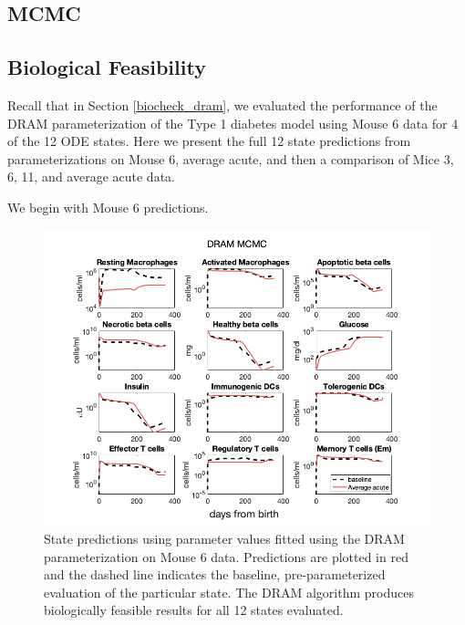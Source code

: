 \begin{appendices}
\section{MCMC} \label{MCMC_appendix}
\subsection{Biological Feasibility} \label{appendix:mcmcBioCheck}
Recall that in Section \ref{biocheck_dram}, we evaluated the performance of the DRAM parameterization of the Type 1 diabetes model using Mouse 6 data for 4 of the 12 ODE states. Here we present the full 12 state predictions from parameterizations on Mouse 6, average acute, and then a comparison of Mice 3, 6, 11, and average acute data.
\par We begin with Mouse 6 predictions.
\begin{figure}[H] 
    \centering
    \includegraphics[width=15cm]{MCMC_figs/dram_t1d_final/allState_mouse6.png}
    \caption{State predictions using parameter values fitted using the DRAM parameterization on Mouse 6 data. Predictions are plotted in red and the dashed line indicates the baseline, pre-parameterized evaluation of the particular state. The DRAM algorithm produces biologically feasible results for all 12 states evaluated.}
    \label{fig:dram_biocheck1}
\end{figure}


\end{appendices}
